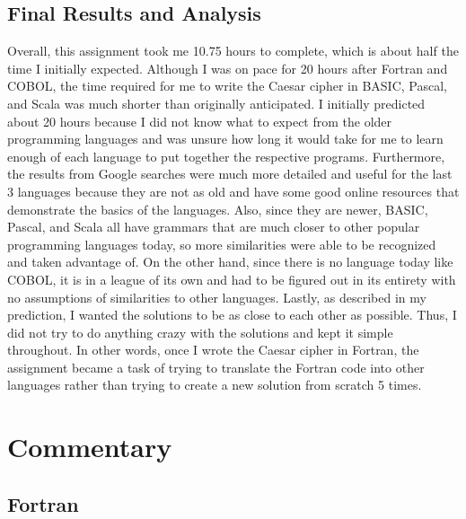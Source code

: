 \documentclass[letterpaper, 10pt, DIV=13]{scrartcl}
\numberwithin{equation}{section}
\numberwithin{figure}{section}
\numberwithin{table}{section}
\begin{document}
\subsection{Final Results and Analysis}
Overall, this assignment took me 10.75 hours to complete, which is about half the time I initially expected. Although I was on pace for 20 hours after Fortran and COBOL, the time required for me to write the Caesar cipher in BASIC, Pascal, and Scala was much shorter than originally anticipated. I initially predicted about 20 hours because I did not know what to expect from the older programming languages and was unsure how long it would take for me to learn enough of each language to put together the respective programs. Furthermore, the results from Google searches were much more detailed and useful for the last 3 languages because they are not as old and have some good online resources that demonstrate the basics of the languages. Also, since they are newer, BASIC, Pascal, and Scala all have grammars that are much closer to other popular programming languages today, so more similarities were able to be recognized and taken advantage of. On the other hand, since there is no language today like COBOL, it is in a league of its own and had to be figured out in its entirety with no assumptions of similarities to other languages. Lastly, as described in my prediction, I wanted the solutions to be as close to each other as possible. Thus, I did not try to do anything crazy with the solutions and kept it simple throughout. In other words, once I wrote the Caesar cipher in Fortran, the assignment became a task of trying to translate the Fortran code into other languages rather than trying to create a new solution from scratch 5 times.

\section{Commentary}
\subsection{Fortran}
\end{document}
